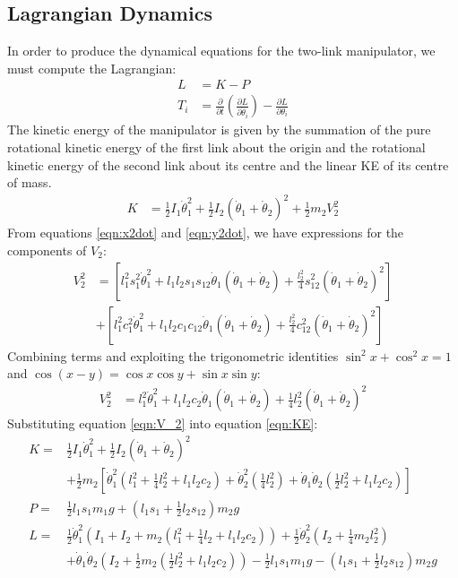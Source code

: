 \subsection*{Lagrangian Dynamics}
In order to produce the dynamical equations for the two-link manipulator, we must compute the Lagrangian:
\begin{align}
	L &= K - P\nonumber \\
	T_i &= \frac{\partial}{\partial{t}}\left(\frac{\partial{L}}{\partial{\dot{\theta}_i}}\right) - \frac{\partial{L}}{\partial{\theta_i}}\label{eqn:T_i}
\end{align}
The kinetic energy of the manipulator is given by the summation of the pure rotational kinetic energy of the first link about the origin and the rotational kinetic energy of the second link about its centre and the linear KE of its centre of mass.
\begin{align}
	K &= \frac{1}{2}I_1\dot{\theta}_1^2 + \frac{1}{2}I_2(\dot{\theta}_1 + \dot{\theta}_2)^2 + \frac{1}{2}m_2 V_2^2\label{eqn:KE}
\end{align}
From equations \ref{eqn:x2dot} and \ref{eqn:y2dot}, we have expressions for the components of $V_2$:
\begin{align*}
	V_2^2 &= \left[l_1^2 s_1^2 \dot{\theta}_1^2 + l_1 l_2 s_1 s_{12} \dot{\theta}_1(\dot{\theta}_1 + \dot{\theta}_2) + \frac{l_2^2}{4} s_{12}^2(\dot{\theta}_1 + \dot{\theta}_2)^2\right] \\
	& + \left[l_1^2 c_1^2 \dot{\theta}_1^2 + l_1 l_2 c_1 c_{12} \dot{\theta}_1(\dot{\theta}_1 + \dot{\theta}_2) + \frac{l_2^2}{4} c_{12}^2(\dot{\theta}_1 + \dot{\theta}_2)^2\right]
\end{align*}
Combining terms and exploiting the trigonometric identities $\sin^2{x} + \cos^2{x} = 1$ and $\cos(x - y) = \cos{x}\cos{y} + \sin{x}\sin{y}$:
\begin{align}
	V_2^2 &= l_1^2 \dot{\theta}_1^2 + l_1 l_2 c_2 \dot{\theta}_1(\dot{\theta}_1 + \dot{\theta}_2) + \frac{1}{4}l_2^2(\dot{\theta}_1 + \dot{\theta}_2)^2\label{eqn:V_2}
\end{align}
Substituting equation \ref{eqn:V_2} into equation \ref{eqn:KE}:
\begin{align}
	K =& \frac{1}{2}I_1\dot{\theta}_1^2 + \frac{1}{2}I_2\left(\dot{\theta}_1 + \dot{\theta}_2\right)^2\nonumber \\
	& + \frac{1}{2}m_2\left[\dot{\theta}_1^2\left(l_1^2 + \frac{1}{4}l_2^2 + l_1 l_2 c_2\right) + \dot{\theta}_2^2\left(\frac{1}{4}l_2^2\right) + \dot{\theta}_1\dot{\theta}_2\left(\frac{1}{2}l_2^2 + l_1 l_2 c_2\right)\right]\nonumber \\
	P =& \frac{1}{2}l_1 s_1 m_1 g + \left(l_1 s_1 + \frac{1}{2}l_2 s_{12}\right)m_2 g\nonumber \\
	L =& \frac{1}{2}\dot{\theta}_1^2 \left(I_1 + I_2 + m_2\left(l_1^2 + \frac{1}{4}l_2 + l_1 l_2 c_2 \right) \right) + \frac{1}{2}\dot{\theta}_2^2\left(I_2 + \frac{1}{4}m_2 l_2^2 \right)\nonumber \\
	& + \dot{\theta}_1\dot{\theta}_2 \left(I_2 + \frac{1}{2}m_2 \left(\frac{1}{2}l_2^2 + l_1 l_2 c_2 \right) \right) - \frac{1}{2}l_1 s_1 m_1 g - \left(l_1 s_1 + \frac{1}{2}l_2 s_{12}\right)m_2 g\label{eqn:L}
\end{align}
